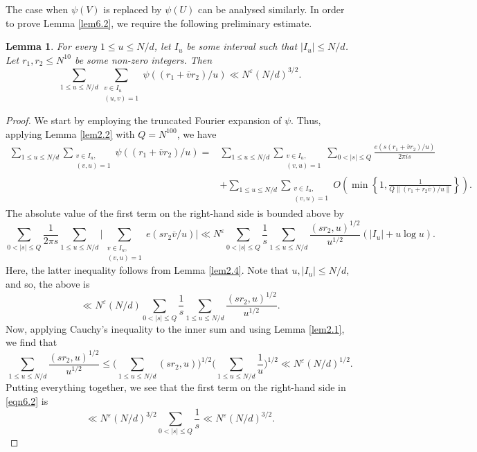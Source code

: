\documentclass[12pt,reqno]{amsart}
\newtheorem{lemma}[theorem]{Lemma}
\theoremstyle{definition}
\theoremstyle{remark}
\numberwithin{equation}{section}
\renewcommand{\leq}{\leqslant}
\def\eps{\varepsilon}
\newcommand{\n}[1]{\|{#1}\|}
\newcommand\1{\mathds{1}}
\begin{document}
The case when $\psi(V)$ is replaced by $\psi(U)$ can be analysed similarly. In order to prove Lemma \ref{lem6.2}, we require the following preliminary estimate. 

\begin{lemma} \label{lem6.3}
    For every $1 \leq u \leq N/d$, let $I_u$ be some interval such that $|I_u| \leq N/d$. Let $r_1, r_2 \leq N^{10}$ be some non-zero integers. Then 
    \[ \sum_{1 \leq u \leq N/d} \sum_{\substack{v \in I_u\\ (u,v) = 1}} \psi((r_1 + \overline{v} r_2)/u) \ll N^{\eps} (N/d)^{3/2}.  \]
\end{lemma}

\begin{proof}
    We start by employing the truncated Fourier expansion of $\psi$. Thus, applying Lemma \ref{lem2.2} with $Q = N^{100}$, we have
    \begin{align} \label{eqn6.2}
    \sum_{1 \leq u \leq N/d} \sum_{\substack{v \in I_u, \\ (v,u) = 1}} \psi((r_1 + \overline{v} r_2)/u) 
    = & \sum_{1 \leq u \leq N/d}  \sum_{\substack{v \in I_u, \\ (v,u) = 1}}  \sum_{0 < |s| \leq Q} \frac{e(s(r_1 + \overline{v}r_2)/u )}{2 \pi i s} \nonumber \\
    & +  \sum_{1 \leq u \leq N/d} \sum_{\substack{v \in I_u, \\ (v,u) = 1}} O \left(  \min\left\{1, \frac{1}{Q \n{ (r_1 + r_2 \overline{v})/u}}   \right\} \right).
    \end{align}
    The absolute value of the first term on the right-hand side is bounded above by
    \[ \sum_{0 < |s| \leq Q} \frac{1}{2 \pi s} \sum_{1 \leq u \leq N/d} \bigg| \sum_{\substack{v \in I_u, \\ (v,u) = 1}} e( s r_2 \overline{v}/u) \bigg| \ll N^{\eps} \sum_{0 < |s| \leq Q} \frac{1}{s} \sum_{1 \leq u \leq N/d} \frac{(s r_2,u)^{1/2}}{u^{1/2}} ( |I_u| + u \log u). \]
    Here, the latter inequality follows from Lemma \ref{lem2.4}. Note that $u, |I_u| \leq N/d$, and so, the above is 
    \[ \ll N^{\eps} (N/d) \sum_{0 < |s| \leq Q} \frac{1}{s} \sum_{1 \leq u \leq N/d} \frac{(sr_2, u)^{1/2}}{u^{1/2}}.  \]
    Now, applying Cauchy's inequality to the inner sum and using Lemma \ref{lem2.1}, we find that
    \[ \sum_{1 \leq u \leq N/d} \frac{(sr_2, u)^{1/2}}{u^{1/2}} \leq \bigg( \sum_{1 \leq u \leq N/d} (sr_2, u) \bigg)^{1/2} \bigg( \sum_{1 \leq u \leq N/d} \frac{1}{u} \bigg)^{1/2} \ll N^{\eps} (N/d)^{1/2}. \]
    Putting everything together, we see that the first term on the right-hand side in \eqref{eqn6.2} is 
    \[ \ll  N^{\eps} (N/d)^{3/2} \sum_{0 < |s| \leq Q} \frac{1}{s} \ll N^{\eps} (N/d)^{3/2}. \]


\end{proof}
\end{document}
